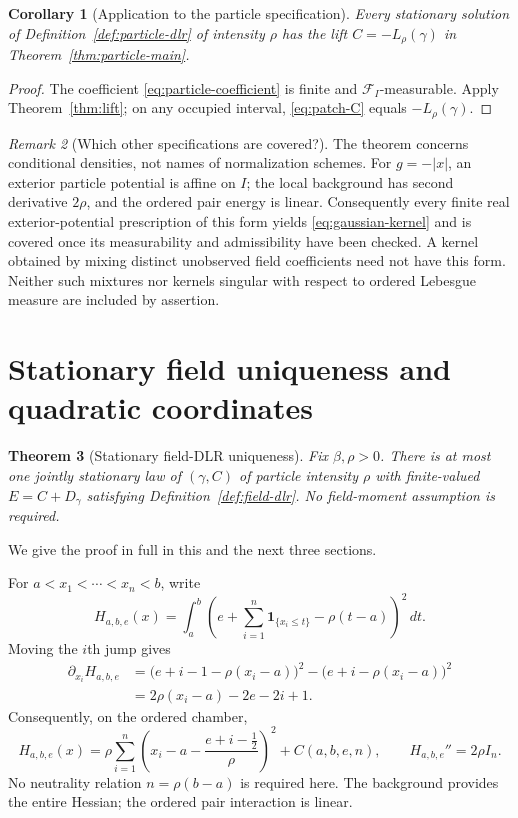 \documentclass[11pt,reqno]{amsart}
\newtheorem{theorem}{Theorem}[section]
\newtheorem{corollary}[theorem]{Corollary}
\theoremstyle{definition}
\theoremstyle{remark}
\newtheorem{remark}[theorem]{Remark}
\newcommand{\1}{\mathbf 1}
\newcommand{\dd}{\,d}
\newcommand{\cF}{\mathcal F}
\numberwithin{equation}{section}
\begin{document}
\begin{corollary}[Application to the particle specification]\label{cor:cesaro-lift}
Every stationary solution of Definition~\ref{def:particle-dlr} of
intensity $\rho$ has the lift $C=-L_\rho(\gamma)$ in
Theorem~\ref{thm:particle-main}.
\end{corollary}
\begin{proof}
The coefficient \eqref{eq:particle-coefficient} is finite and
$\cF_I$-measurable. Apply Theorem~\ref{thm:lift}; on any occupied
interval, \eqref{eq:patch-C} equals $-L_\rho(\gamma)$.
\end{proof}

\begin{remark}[Which other specifications are covered?]
The theorem concerns conditional densities, not names of normalization
schemes. For $g=-|x|$, an exterior particle potential is affine on $I$;
the local background has second derivative $2\rho$, and the ordered
pair energy is linear. Consequently every finite real exterior-potential
prescription of this form yields \eqref{eq:gaussian-kernel} and is
covered once its measurability and admissibility have been checked.
A kernel obtained by mixing distinct unobserved field coefficients
need not have this form. Neither such mixtures nor kernels singular
with respect to ordered Lebesgue measure are included by assertion.
\end{remark}

\section{Stationary field uniqueness and quadratic coordinates}\label{sec:quadratic}

\begin{theorem}[Stationary field-DLR uniqueness]\label{thm:field-unique}
Fix $\beta,\rho>0$. There is at most one jointly stationary law of
$(\gamma,C)$ of particle intensity $\rho$ with finite-valued
$E=C+D_\gamma$ satisfying Definition~\ref{def:field-dlr}.
No field-moment assumption is required.
\end{theorem}

We give the proof in full in this and the next three sections.



For $a<x_1<\cdots<x_n<b$, write
\[
 H_{a,b,e}(x)=\int_a^b
 \left(e+\sum_{i=1}^n\1_{\{x_i\le t\}}-\rho(t-a)\right)^2\dd t.
\]
Moving the $i$th jump gives
\begin{align*}
 \partial_{x_i}H_{a,b,e}
 &=\big(e+i-1-\rho(x_i-a)\big)^2
   -\big(e+i-\rho(x_i-a)\big)^2\\
 &=2\rho(x_i-a)-2e-2i+1.
\end{align*}
Consequently, on the ordered chamber,
\begin{equation}\label{eq:quadratic}
 H_{a,b,e}(x)=\rho\sum_{i=1}^n
 \left(x_i-a-\frac{e+i-\frac12}{\rho}\right)^2+C(a,b,e,n),
 \qquad H_{a,b,e}''=2\rho I_n.
\end{equation}
No neutrality relation $n=\rho(b-a)$ is required here. The background
provides the entire Hessian; the ordered pair interaction is linear.
\end{document}
